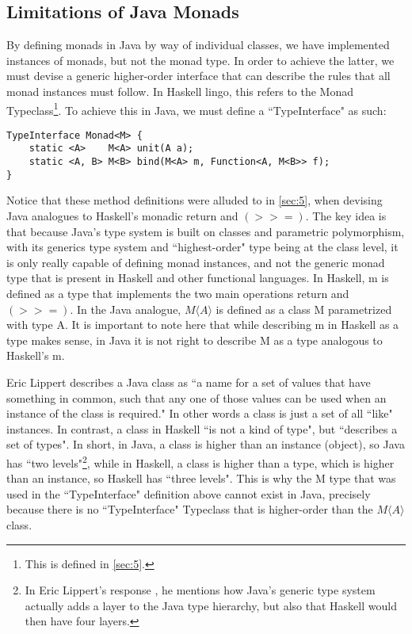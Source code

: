 \subsection{Limitations of Java Monads}
\label{sec:10}

By defining monads in Java by way of individual classes, we have implemented instances of monads, but not the monad type. In order to achieve the latter, we must devise a generic higher-order interface that can describe the rules that all monad instances must follow. In Haskell lingo, this refers to the Monad Typeclass\footnote{This is defined in \ref{sec:5}.}. To achieve this in Java, we must define a ``TypeInterface" \cite{eric-lippert-generic-monad-typeinterface} as such:

\begin{verbatim}
TypeInterface Monad<M> {
    static <A>    M<A> unit(A a);
    static <A, B> M<B> bind(M<A> m, Function<A, M<B>> f);
}
\end{verbatim}

Notice that these method definitions were alluded to in \ref{sec:5}, when devising Java analogues to Haskell's monadic return and $(>>=)$. The key idea is that because Java's type system is built on classes and parametric polymorphism, with its generics type system and ``highest-order" type being at the class level, it is only really capable of defining monad instances, and not the generic monad type that is present in Haskell and other functional languages. In Haskell, m is defined as a type that implements the two main operations return and $(>>=)$. In the Java analogue, $M \langle A \rangle$ is defined as a class M parametrized with type A. It is important to note here that while describing m in Haskell as a type makes sense, in Java it is not right to describe M as a type analogous to Haskell's m.

Eric Lippert describes a Java class as ``a name for a set of values that have something in common, such that any one of those values can be used when an instance of the class is required." In other words a class is just a set of all ``like" instances. In contrast, a class in Haskell ``is not a kind of type", but ``describes a set of types". In short, in Java, a class is higher than an instance (object), so Java has ``two levels"\footnote{In Eric Lippert's response \cite{eric-lippert-generic-monad-typeinterface}, he mentions how Java's generic type system actually adds a layer to the Java type hierarchy, but also that Haskell would then have four layers.}, while in Haskell, a class is higher than a type, which is higher than an instance, so Haskell has ``three levels". This is why the M type that was used in the ``TypeInterface" definition above cannot exist in Java, precisely because there is no ``TypeInterface" Typeclass that is higher-order than the $M \langle A \rangle$ class.

